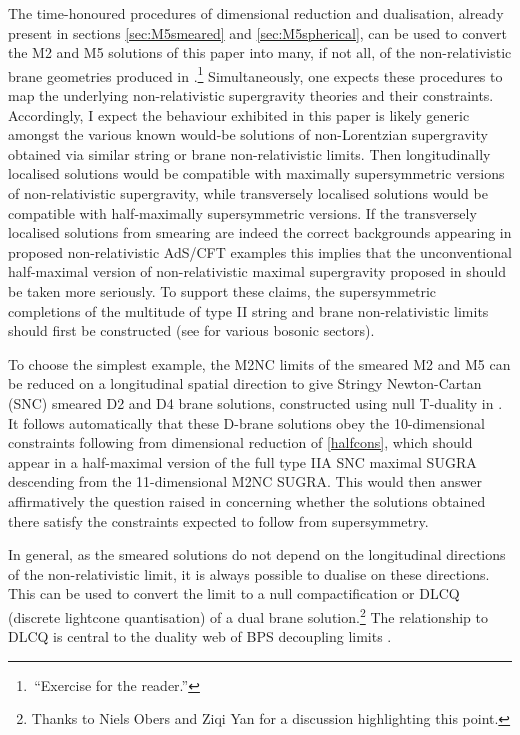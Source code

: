 \documentclass[11pt]{article}
\numberwithin{equation}{section}
\begin{document}
{{The time-honoured procedures of dimensional reduction and dualisation, already present in sections \ref{sec:M5smeared} and \ref{sec:M5spherical}, can be used to convert the M2 and M5 solutions of this paper into many, if not all, of the non-relativistic brane geometries produced in \cite{Lambert:2024uue, Lambert:2024yjk,Fontanella:2024rvn,Fontanella:2024kyl,Blair:2024aqz,Lambert:2024ncn,Harmark:2025ikv}.\footnote{\,``Exercise for the reader.''}
Simultaneously, one expects these procedures to map the underlying non-relativistic supergravity theories and their constraints.
Accordingly, I expect the behaviour exhibited in this paper is likely generic amongst the various known would-be solutions of non-Lorentzian supergravity obtained via similar string or brane non-relativistic limits.
Then longitudinally localised solutions would be compatible with maximally supersymmetric versions of non-relativistic supergravity, while transversely localised solutions would be compatible with half-maximally supersymmetric versions.
If the transversely localised solutions from smearing are indeed the correct backgrounds appearing in proposed non-relativistic AdS/CFT examples this implies that the unconventional half-maximal version of non-relativistic maximal supergravity proposed in \cite{Bergshoeff:2024nin} should be taken more seriously.
To support these claims, the supersymmetric completions of the multitude of type II string and brane non-relativistic limits should first be constructed (see \cite{Blair:2021waq,Bergshoeff:2023ogz,Lambert:2024ncn} for various bosonic sectors).

To choose the simplest example, the M2NC limits of the smeared M2 and M5 can be reduced on a longitudinal spatial direction to give Stringy Newton-Cartan (SNC) smeared D2 and D4 brane solutions, constructed using null T-duality in \cite{Harmark:2025ikv}. 
It follows automatically that these D-brane solutions obey the 10-dimensional constraints following from dimensional reduction of \eqref{halfcons}, which should appear in a half-maximal version of the full type IIA SNC maximal SUGRA descending from the 11-dimensional M2NC SUGRA.
This would then answer affirmatively the question raised in \cite{Harmark:2025ikv} concerning whether the solutions obtained there satisfy the constraints expected to follow from supersymmetry.

In general, as the smeared solutions do not depend on the longitudinal directions of the non-relativistic limit, it is always possible to dualise on these directions. This can be used to convert the limit to a null compactification or DLCQ (discrete lightcone quantisation) of a dual brane solution.\footnote{Thanks to Niels Obers and Ziqi Yan for a discussion highlighting this point.}
The relationship to DLCQ is central to the duality web of BPS decoupling limits \cite{Blair:2023noj, Gomis:2023eav, Blair:2024aqz,Harmark:2025ikv}.

}}
\end{document}
